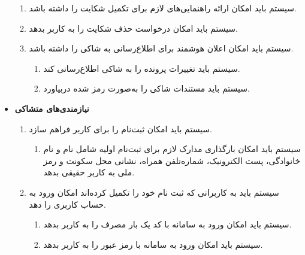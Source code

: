 \documentclass[12pt,a4paper,oneside]{article}
\begin{document}
\begin{itemize}
\begin{enumerate}
        \item 
        سیستم باید امکان ارائه راهنمایی‌های لازم برای تکمیل شکایت را داشته باشد.

        \item 
        سیستم باید امکان درخواست حذف شکایت را به کاربر بدهد.

		\item 
        سیستم باید امکان اعلان هوشمند برای اطلاع‌رسانی به شاکی را داشته باشد.
        \begin{enumerate}
            \renewcommand{\labelenumii}{\textbf{.R\arabic{enumi}.\arabic{enumii}}}
            \item 
            سیستم باید تغییرات پرونده را به شاکی اطلاع‌رسانی کند.

			\item 
			سیستم باید مستندات شاکی را به‌صورت رمز شده دربیاورد.

        \end{enumerate}


    \end{enumerate}

    \item
    \textbf{نیازمندی‌های متشاکی}
    \begin{enumerate}
        \renewcommand{\labelenumi}{\textbf{.R\arabic{enumi}}}
        \setcounter{enumi}{22}

		
        \item 
        سیستم باید امکان ثبت‌نام را برای کاربر فراهم سازد.
        \begin{enumerate}
            \renewcommand{\labelenumii}{\textbf{.R\arabic{enumi}.\arabic{enumii}}}
            \item 
            سیستم باید امکان بارگذاری مدارک لازم برای ثبت‌نام اولیه شامل نام و نام خانوادگی، پست الکترونیک، شماره‌تلفن همراه، نشانی محل سکونت و رمز ملی به کاربر حقیقی بدهد.
        \end{enumerate}

        \item 
        سیستم باید به کاربرانى که ثبت نام خود را تکمیل کرده‌اند امکان ورود به حساب کاربری را دهد.
        \begin{enumerate}
            \renewcommand{\labelenumii}{\textbf{.R\arabic{enumi}.\arabic{enumii}}}
            \item 
            سیستم باید امکان ورود به سامانه با کد یک بار مصرف را به کاربر بدهد.
            \item 
            سیستم باید امکان ورود به سامانه با رمز عبور را به کاربر بدهد.
        \end{enumerate}


\end{enumerate}
\end{itemize}
\end{document}
